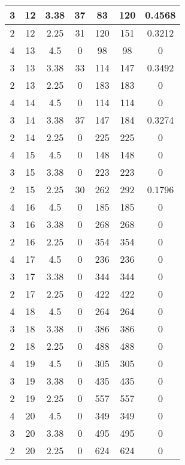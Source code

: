 \documentclass[letterpaper, 12pt]{article}
\begin{document}
\begin{longtable}{|c|c|c|c|c|c|c|}
\hline
3 & 12 & 3.38 & 37 & 83 & 120 & 0.4568 \\
\hline
2 & 12 & 2.25 & 31 & 120 & 151 & 0.3212 \\
\hline
4 & 13 & 4.5 & 0 & 98 & 98 & 0 \\
\hline
3 & 13 & 3.38 & 33 & 114 & 147 & 0.3492 \\
\hline
2 & 13 & 2.25 & 0 & 183 & 183 & 0 \\
\hline
4 & 14 & 4.5 & 0 & 114 & 114 & 0 \\
\hline
3 & 14 & 3.38 & 37 & 147 & 184 & 0.3274 \\
\hline
2 & 14 & 2.25 & 0 & 225 & 225 & 0 \\
\hline
4 & 15 & 4.5 & 0 & 148 & 148 & 0 \\
\hline
3 & 15 & 3.38 & 0 & 223 & 223 & 0 \\
\hline
2 & 15 & 2.25 & 30 & 262 & 292 & 0.1796 \\
\hline
4 & 16 & 4.5 & 0 & 185 & 185 & 0 \\
\hline
3 & 16 & 3.38 & 0 & 268 & 268 & 0 \\
\hline
2 & 16 & 2.25 & 0 & 354 & 354 & 0 \\
\hline
4 & 17 & 4.5 & 0 & 236 & 236 & 0 \\
\hline
3 & 17 & 3.38 & 0 & 344 & 344 & 0 \\
\hline
2 & 17 & 2.25 & 0 & 422 & 422 & 0 \\
\hline
4 & 18 & 4.5 & 0 & 264 & 264 & 0 \\
\hline
3 & 18 & 3.38 & 0 & 386 & 386 & 0 \\
\hline
2 & 18 & 2.25 & 0 & 488 & 488 & 0 \\
\hline
4 & 19 & 4.5 & 0 & 305 & 305 & 0 \\
\hline
3 & 19 & 3.38 & 0 & 435 & 435 & 0 \\
\hline
2 & 19 & 2.25 & 0 & 557 & 557 & 0 \\
\hline
4 & 20 & 4.5 & 0 & 349 & 349 & 0 \\
\hline
3 & 20 & 3.38 & 0 & 495 & 495 & 0 \\
\hline
2 & 20 & 2.25 & 0 & 624 & 624 & 0 \\
\hline
\end{longtable}
\end{document}
